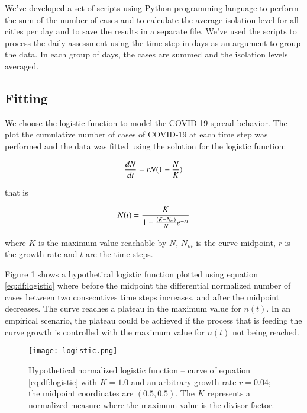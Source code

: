 \documentclass[review]{elsarticle}
\begin{document}
We’ve developed a set of scripts using Python programming language to perform the sum of the 
number of cases and to calculate the average isolation level for all cities per day and to save
 the results in a separate file. We’ve used the scripts to process the daily assessment using
 the time step in days as an argument to group the data. In each group of days,
 the cases are summed and the isolation levels averaged.

\subsection{Fitting}

We choose the logistic function to model the COVID-19 spread behavior. 
The plot the cumulative number of cases of COVID-19 at each time step 
was performed and the data was fitted using the solution for the logistic function:

\begin{equation}
{dN \over dt} = r N (1 - {N \over K})
\label{eq:df:logistic}
\end{equation}

\noindent that is

\begin{equation}
N(t) = {K \over {1- {(K-N_{m}) \over N} e^{-rt}}}
\label{eq:exp:logistic}
\end{equation}

\noindent where $K$ is the maximum value reachable by $N$, 
$N_m$ is the curve midpoint, 
$r$ is the growth rate 
and $t$ are the time steps.

Figure \ref{fig:logistic} shows a hypothetical logistic function 
plotted using equation \ref{eq:df:logistic} where before the midpoint 
the differential normalized number of cases between 
two consecutives time steps increases, 
and after the midpoint decreases. 
The curve reaches a plateau in the maximum value for $n(t)$. 
In an empirical scenario, the plateau could be achieved 
if the process that is feeding the curve 
growth is controlled with the maximum 
value for $n(t)$ not being reached.

\begin{figure}
\texttt{[image: logistic.png]}
\caption{Hypothetical normalized logistic function -- 
curve of equation \ref{eq:df:logistic} with 
$K=1.0$ and an arbitrary growth rate $r=0.04$; 
the midpoint coordinates are $(0.5, 0.5)$.
The $K$ represents a normalized measure where 
the maximum value is the divisor factor.}
\label{fig:logistic}
\end{figure}
\end{document}
